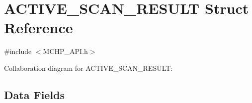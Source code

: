 \hypertarget{struct_a_c_t_i_v_e___s_c_a_n___r_e_s_u_l_t}{}\section{A\+C\+T\+I\+V\+E\+\_\+\+S\+C\+A\+N\+\_\+\+R\+E\+S\+U\+L\+T Struct Reference}
\label{struct_a_c_t_i_v_e___s_c_a_n___r_e_s_u_l_t}


{\ttfamily \#include $<$M\+C\+H\+P\+\_\+\+A\+P\+I.\+h$>$}



Collaboration diagram for A\+C\+T\+I\+V\+E\+\_\+\+S\+C\+A\+N\+\_\+\+R\+E\+S\+U\+L\+T\+:
\subsection*{Data Fields}
